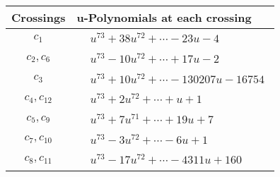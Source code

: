 \documentclass[1p]{elsarticle_modified}
\theoremstyle{definition}
\begin{document}
\begin{tabular}{m{50pt}|m{274pt}}
Crossings & \hspace{64pt}u-Polynomials at each crossing \\
\hline $$\begin{aligned}c_{1}\end{aligned}$$&$\begin{aligned}
&u^{73}+38 u^{72}+\cdots-23 u-4
\end{aligned}$\\
\hline $$\begin{aligned}c_{2},c_{6}\end{aligned}$$&$\begin{aligned}
&u^{73}-10 u^{72}+\cdots+17 u-2
\end{aligned}$\\
\hline $$\begin{aligned}c_{3}\end{aligned}$$&$\begin{aligned}
&u^{73}+10 u^{72}+\cdots-130207 u-16754
\end{aligned}$\\
\hline $$\begin{aligned}c_{4},c_{12}\end{aligned}$$&$\begin{aligned}
&u^{73}+2 u^{72}+\cdots+u+1
\end{aligned}$\\
\hline $$\begin{aligned}c_{5},c_{9}\end{aligned}$$&$\begin{aligned}
&u^{73}+7 u^{71}+\cdots+19 u+7
\end{aligned}$\\
\hline $$\begin{aligned}c_{7},c_{10}\end{aligned}$$&$\begin{aligned}
&u^{73}-3 u^{72}+\cdots-6 u+1
\end{aligned}$\\
\hline $$\begin{aligned}c_{8},c_{11}\end{aligned}$$&$\begin{aligned}
&u^{73}-17 u^{72}+\cdots-4311 u+160
\end{aligned}$\\
\hline
\end{tabular}\\~\\
\newpage\renewcommand{\arraystretch}{1}
\end{document}
